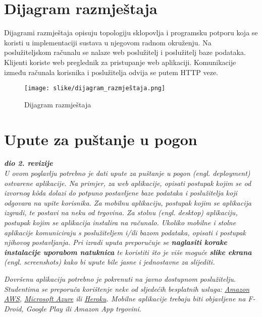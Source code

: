 			\eject 
		
		
		\section{Dijagram razmještaja}
			
			Dijagrami razmještaja opisuju topologiju sklopovlja i programsku potporu koja se koristi u implementaciji sustava u njegovom radnom okruženju. Na poslužiteljskom računalu se nalaze web poslužitelj i poslužitelj baze podataka. Klijenti koriste web preglednik za pristupanje web aplikaciji. Komunikacije između računala korisnika i poslužitelja odvija se putem HTTP veze.	
			\begin{figure}[H]
				\centerline{\texttt{[image: slike/dijagram\_razmještaja.png]}}
				\caption{Dijagram razmještaja}
				\label{fig:dijagram_razmjestaja}
			\end{figure}
			
			\eject 
		
		\section{Upute za puštanje u pogon}
		
			\textbf{\textit{dio 2. revizije}}\\
		
			 \textit{U ovom poglavlju potrebno je dati upute za puštanje u pogon (engl. deployment) ostvarene aplikacije. Na primjer, za web aplikacije, opisati postupak kojim se od izvornog kôda dolazi do potpuno postavljene baze podataka i poslužitelja koji odgovara na upite korisnika. Za mobilnu aplikaciju, postupak kojim se aplikacija izgradi, te postavi na neku od trgovina. Za stolnu (engl. desktop) aplikaciju, postupak kojim se aplikacija instalira na računalo. Ukoliko mobilne i stolne aplikacije komuniciraju s poslužiteljem i/ili bazom podataka, opisati i postupak njihovog postavljanja. Pri izradi uputa preporučuje se \textbf{naglasiti korake instalacije uporabom natuknica} te koristiti što je više moguće \textbf{slike ekrana} (engl. screenshots) kako bi upute bile jasne i jednostavne za slijediti.}
			
			
			 \textit{Dovršenu aplikaciju potrebno je pokrenuti na javno dostupnom poslužitelju. Studentima se preporuča korištenje neke od sljedećih besplatnih usluga: \href{https://aws.amazon.com/}{Amazon AWS}, \href{https://azure.microsoft.com/en-us/}{Microsoft Azure} ili \href{https://www.heroku.com/}{Heroku}. Mobilne aplikacije trebaju biti objavljene na F-Droid, Google Play ili Amazon App trgovini.}
			
			
			\eject 